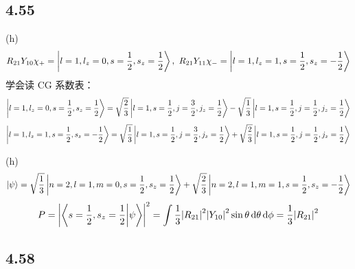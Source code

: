 \subsection{4.55}
\begin{framed}
    (h)
    \[
    R_{2 1} Y_{1 0} \chi_+ = \ket{l = 1, l_z = 0, s = \frac{1}{2}, s_z = \frac{1}{2}},\ R_{2 1} Y_{1 1} \chi_- = \ket{l = 1, l_z = 1, s = \frac{1}{2}, s_{z} = - \frac{1}{2}}
    \] 学会读 CG 系数表： \[
    \ket{l = 1, l_z = 0, s = \frac{1}{2}, s_z = \frac{1}{2}} = \sqrt{\frac{2}{3}} \ket{l = 1, s = \frac{1}{2}, j = \frac{3}{2}, j_z = \frac{1}{2}} - \sqrt{\frac{1}{3}} \ket{l = 1, s = \frac{1}{2}, j = \frac{1}{2}, j_z = \frac{1}{2}}
    \] \[
    \ket{l = 1, l_z = 1, s = \frac{1}{2}, s_z = - \frac{1}{2}} = \sqrt{\frac{1}{3}} \ket{l = 1, s = \frac{1}{2}, j = \frac{3}{2}, j_z = \frac{1}{2}} + \sqrt{\frac{2}{3}} \ket{l = 1, s = \frac{1}{2}, j = \frac{1}{2}, j_z = \frac{1}{2}}
    \]

    (h)
    \[
    \ket{\psi} = \sqrt{\frac{1}{3}} \ket{n = 2, l = 1, m = 0, s = \frac{1}{2}, s_z = \frac{1}{2}} + \sqrt{\frac{2}{3}} \ket{n = 2, l = 1, m = 1, s = \frac{1}{2}, s_z = - \frac{1}{2}}
    \] \[
    P = \qty|\braket{s = \frac{1}{2}, s_z = \frac{1}{2}}{\psi}|^2 = \int \frac{1}{3} \qty|R_{21}|^2 \qty|Y_{10}|^2 \sin \theta \dd{\theta} \dd{\phi} = \frac{1}{3} \qty|R_{21}|^2
    \]
\end{framed}

\subsection{4.58}
\begin{framed}
    
\end{framed}